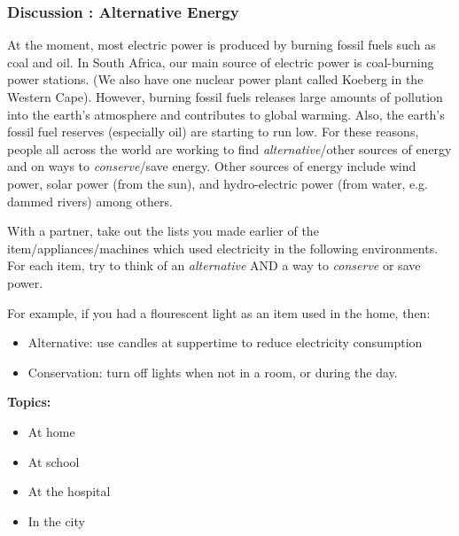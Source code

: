             \subsubsection{ Discussion : Alternative Energy }
            \nopagebreak
            \label{m38771*id63771}At the moment, most electric power is produced by burning fossil fuels such as coal and oil. In South Africa, our main
source of electric power is coal-burning power stations. (We also have one nuclear power plant called Koeberg in the Western Cape). However, burning fossil fuels releases large amounts of pollution into the earth's atmosphere and contributes
to global warming. Also, the earth's fossil fuel reserves (especially oil) are starting to run low. For these reasons, people all across the world are working to find \textsl{alternative}/other sources of energy and on ways to \textsl{conserve}/save energy. Other sources of energy include
wind power, solar power (from the sun), and hydro-electric power (from water, e.g. dammed rivers) among others.\par 
          \label{m38771*id63794}With a partner, take out the lists you made earlier of the item/appliances/machines which used electricity in the following environments. For each item, try to think of an \textsl{alternative} AND a way to \textsl{conserve} or save power.\par 
          \label{m38771*id63812}For example, if you had a flourescent light as an item used in the home, then:\par 
          \label{m38771*id63819}\begin{itemize}[noitemsep]
            \label{m38771*uid34}\item Alternative: use candles at suppertime to reduce electricity consumption
\label{m38771*uid35}\item Conservation: turn off lights when not in a room, or during the day.
\end{itemize}
        
          \label{m38771*id63848}
            \textbf{Topics:}
          \par 
          \label{m38771*id63857}\begin{itemize}[noitemsep]
            \label{m38771*uid36}\item At home
\label{m38771*uid37}\item At school
\label{m38771*uid38}\item At the hospital
\label{m38771*uid39}\item In the city
\end{itemize}
        
